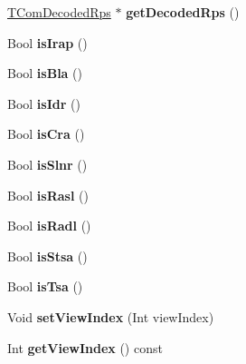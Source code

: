 \begin{DoxyCompactItemize}
\item 
\mbox{\label{class_t_com_pic_a258f1b4ad8d880ed2c5e00d58a97c786}} 
\hyperlink{class_t_com_decoded_rps}{T\+Com\+Decoded\+Rps} $\ast$ {\bfseries get\+Decoded\+Rps} ()
\item 
\mbox{\label{class_t_com_pic_aec6b03f723a6a7e264b40540b11711ae}} 
Bool {\bfseries is\+Irap} ()
\item 
\mbox{\label{class_t_com_pic_a4011d81ad4f654cf22f7815eadfaa7a6}} 
Bool {\bfseries is\+Bla} ()
\item 
\mbox{\label{class_t_com_pic_adedc853fe3a3d0a4e4a5bb2c9e172b15}} 
Bool {\bfseries is\+Idr} ()
\item 
\mbox{\label{class_t_com_pic_aa78c2fc53f84e6de1e01a59ee71f6add}} 
Bool {\bfseries is\+Cra} ()
\item 
\mbox{\label{class_t_com_pic_a9a8e4afa3c8ad917c7609cc73eda7e70}} 
Bool {\bfseries is\+Slnr} ()
\item 
\mbox{\label{class_t_com_pic_a68fb32368df72f3beea301244bfacfb1}} 
Bool {\bfseries is\+Rasl} ()
\item 
\mbox{\label{class_t_com_pic_aae56a7719bd0705104f99a0cc91a87fd}} 
Bool {\bfseries is\+Radl} ()
\item 
\mbox{\label{class_t_com_pic_aae1b319ce11fdc9a185ff6cb412ca834}} 
Bool {\bfseries is\+Stsa} ()
\item 
\mbox{\label{class_t_com_pic_ad7ee9c5c483578faaa4d1f1e64e1e689}} 
Bool {\bfseries is\+Tsa} ()
\item 
\mbox{\label{class_t_com_pic_aeaae5d4b82fa21fc8c1ac3197db41383}} 
Void {\bfseries set\+View\+Index} (Int view\+Index)
\item 
\mbox{\label{class_t_com_pic_a0a677d6540f0ea1a34d8631d1902858c}} 
Int {\bfseries get\+View\+Index} () const
\item 

\end{DoxyCompactItemize}
